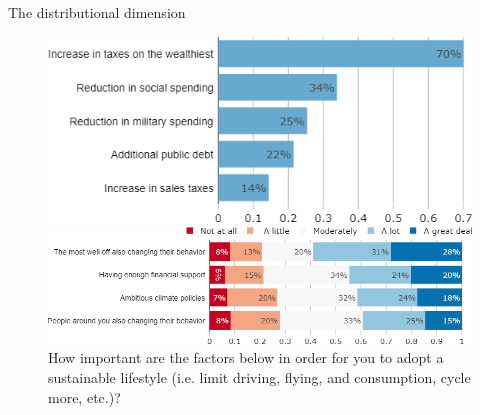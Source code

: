 \begin{framefont}{\small}
\begin{frame}{The distributional dimension}
\begin{figure}
	\vspace{-.2cm}
	\caption{%
	What sources of funding do you find appropriate for public investments in green infrastructure? (Multiple answers are possible)}
	\vspace{-.4cm}
	\includegraphics[width=.45\paperwidth]{../figures/FR/investments_funding_FR.png}
	\caption{How important are the factors below in order for you to adopt a sustainable lifestyle (i.e. limit driving, flying, and consumption, cycle more, etc.)?}
	\vspace{-.4cm}
	\includegraphics[width=.7\paperwidth]{../figures/FR/condition_FR.png}
\end{figure}
\end{frame}


\end{framefont}

